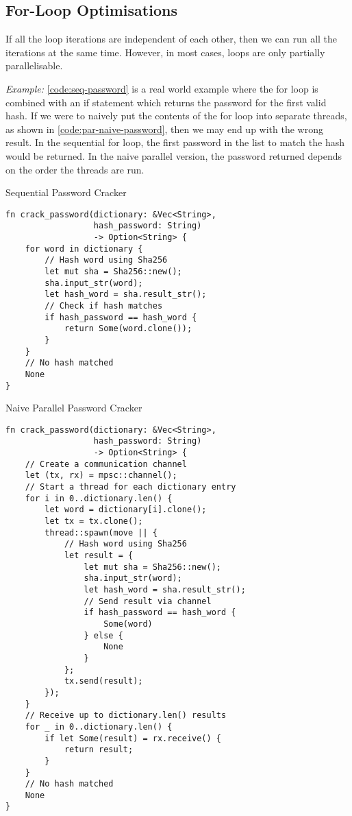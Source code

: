 \documentclass[conference]{IEEEtran}
\begin{document}
\subsection{For-Loop Optimisations}
If all the loop iterations are independent of each other, then we can run all the iterations at the same time. However, in most cases, loops are only partially parallelisable.

\textit{Example:}
\autoref{code:seq-password} is a real world example where the for loop is combined with an if statement which returns the password for the first valid hash. If we were to naively put the contents of the for loop into separate threads, as shown in \autoref{code:par-naive-password}, then we may end up with the wrong result. In the sequential for loop, the first password in the list to match the hash would be returned. In the naive parallel version, the password returned depends on the order the threads are run.

\begin{algorithm}
\caption{Sequential Password Cracker}
\label{code:seq-password}
\begin{verbatim}
fn crack_password(dictionary: &Vec<String>,
                  hash_password: String)
                  -> Option<String> {
    for word in dictionary {
        // Hash word using Sha256
        let mut sha = Sha256::new();
        sha.input_str(word);
        let hash_word = sha.result_str();
        // Check if hash matches
        if hash_password == hash_word {
            return Some(word.clone());
        }
    }
    // No hash matched
    None
}
\end{verbatim}
\end{algorithm}

\begin{algorithm}
\caption{Naive Parallel Password Cracker}
\label{code:par-naive-password}
\begin{verbatim}
fn crack_password(dictionary: &Vec<String>,
                  hash_password: String)
                  -> Option<String> {
    // Create a communication channel
    let (tx, rx) = mpsc::channel();
    // Start a thread for each dictionary entry
    for i in 0..dictionary.len() {
        let word = dictionary[i].clone();
        let tx = tx.clone();
        thread::spawn(move || {
            // Hash word using Sha256
            let result = {
                let mut sha = Sha256::new();
                sha.input_str(word);
                let hash_word = sha.result_str();
                // Send result via channel
                if hash_password == hash_word {
                    Some(word)
                } else {
                    None
                }
            };
            tx.send(result);
        });
    }
    // Receive up to dictionary.len() results
    for _ in 0..dictionary.len() {
        if let Some(result) = rx.receive() {
            return result;
        }
    }
    // No hash matched
    None
}
\end{verbatim}
\end{algorithm}
\end{document}
